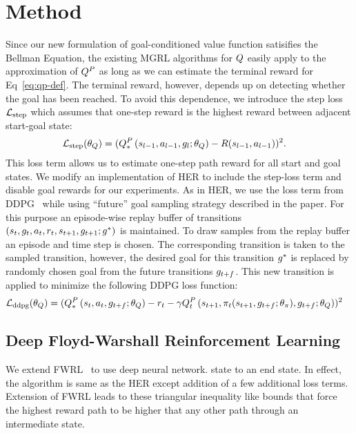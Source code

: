 \section{Method}
Since our new formulation of goal-conditioned value function satisifies the
Bellman Equation, the existing MGRL algorithms for $\fw$ easily apply to the
approximation of $\fw^P$ as long as we can estimate the terminal reward for
Eq~\eqref{eq:qp-def}. The terminal reward, however, depends up on detecting
whether the goal has been reached. To avoid this dependence, we introduce the
step loss $\LossStep$ which assumes that one-step reward is the highest reward between
adjacent start-goal state:
%
\begin{align}
      \LossStep(\param_\fw) &= (\fwargs{\state_{l-1}}{\act_{l-1}}{\goal_{l};\param_\fw}{*}{P} - \Rew(\state_{l-1}, \act_{l-1}))^2.
\end{align}
%
This loss term allows us to estimate one-step path reward for all start and goal
states.
We modify an implementation of HER to include the step-loss term and disable goal
rewards for our experiments.
As in HER, we use the loss term from DDPG~\cite{lillicrap2015continuous} while
using ``future'' goal sampling strategy described in the paper.
For this purpose an episode-wise replay buffer of transitions $(\state_t,
\goal_t, \act_t, \rew_t, \state_{t+1}, \goal_{t+1}; \goal^*)$ is maintained. To draw samples
from the replay buffer an episode and time step is chosen. The corresponding
transition is taken to the sampled transition, however, the desired goal for
this transition $\goal^*$ is replaced by randomly chosen goal from the future
transitions $\goal_{t+f}$. This new transition is applied to minimize the
following DDPG loss function:
%
\begin{align}
  \LossDDPG(\param_\fw) &= (\fwargs{\state_{t}}{\act_{t}}{\goal_{t+f}; \param_\fw}{*}{P} -
      \rew_t - \discount\fwargs{\state_{t+1}}{\policy_t(\state_{t+1}, \goal_{t+f};\param_\policy)}{\goal_{t+f};\param_\fw}{t}{P})^2
\end{align}
%

\subsection{Deep Floyd-Warshall Reinforcement Learning}

We extend FWRL~\citep{dhiman2018floydwarshall} to use deep neural network.
state to an end state. In effect, the algorithm is same as the HER except
addition of a few additional loss terms.
Extension of FWRL leads to these triangular inequality like
bounds that force the highest reward path to be higher that any other path
through an intermediate state.

